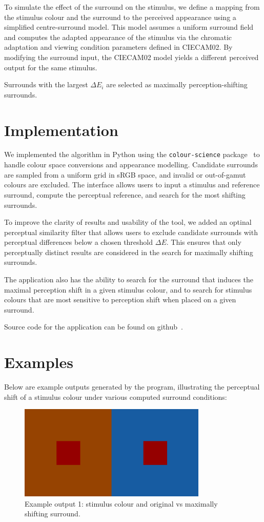 \documentclass[11pt]{article}
\begin{document}
To simulate the effect of the surround on the stimulus, we define a mapping from the stimulus colour and the surround to the perceived appearance using a simplified centre-surround model. This model assumes a uniform surround field and computes the adapted appearance of the stimulus via the chromatic adaptation and viewing condition parameters defined in CIECAM02. By modifying the surround input, the CIECAM02 model yields a different perceived output for the same  stimulus.

Surrounds with the largest $\Delta E_i$ are selected as maximally perception-shifting surrounds.

\section{Implementation}
We implemented the algorithm in Python using the \texttt{colour-science} package~\cite{colour} to handle colour space conversions and appearance modelling. Candidate surrounds are sampled from a uniform grid in sRGB space, and invalid or out-of-gamut colours are excluded. The interface allows users to input a stimulus and reference surround, compute the perceptual reference, and search for the most shifting surrounds.

To improve the clarity of results and usability of the tool, we added an optinal  perceptual similarity filter that allows users to exclude candidate surrounds with perceptual differences below a chosen threshold $\Delta E$. This ensures that only perceptually distinct results are considered in the search for maximally shifting surrounds.

The application also has the ability to search for the surround that induces the maximal perception shift in a given stimulus colour, and to search for stimulus colours that are most sensitive to perception shift when placed on a given surround.

Source code for the application can be found on github~\cite{colourshift}.

\section{Examples}

Below are example outputs generated by the program, illustrating the perceptual shift of a stimulus colour under various computed surround conditions:

\begin{figure}[h!]
\centering
\includegraphics[width=0.8\textwidth]{1.png}
\caption{Example output 1: stimulus colour and original vs maximally shifting surround.}
\end{figure}
\end{document}
